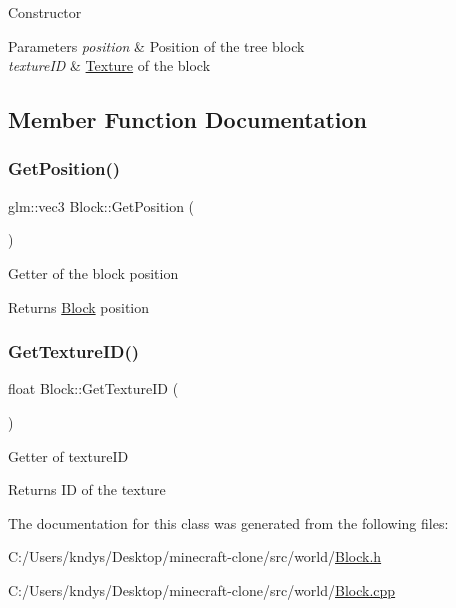 Constructor 


\begin{DoxyParams}{Parameters}
{\em position} & Position of the tree block\\
\hline
{\em texture\+ID} & \mbox{\hyperlink{class_texture}{Texture}} of the block\\
\hline
\end{DoxyParams}


\subsection{Member Function Documentation}
\mbox{\label{class_block_aa35387c6d2b82e94188fa76559ac4d78}} 
\subsubsection{\texorpdfstring{Get\+Position()}{GetPosition()}}
{\footnotesize\ttfamily glm\+::vec3 Block\+::\+Get\+Position (\begin{DoxyParamCaption}{ }\end{DoxyParamCaption})}



Getter of the block position 

\begin{DoxyReturn}{Returns}
\mbox{\hyperlink{class_block}{Block}} position
\end{DoxyReturn}
\mbox{\label{class_block_af44cfa5e8853286c3f014e97eaabbaa4}} 
\subsubsection{\texorpdfstring{Get\+Texture\+I\+D()}{GetTextureID()}}
{\footnotesize\ttfamily float Block\+::\+Get\+Texture\+ID (\begin{DoxyParamCaption}{ }\end{DoxyParamCaption})}



Getter of texture\+ID 

\begin{DoxyReturn}{Returns}
ID of the texture
\end{DoxyReturn}


The documentation for this class was generated from the following files\+:\begin{DoxyCompactItemize}
\item 
C\+:/\+Users/kndys/\+Desktop/minecraft-\/clone/src/world/\mbox{\hyperlink{_block_8h}{Block.\+h}}\item 
C\+:/\+Users/kndys/\+Desktop/minecraft-\/clone/src/world/\mbox{\hyperlink{_block_8cpp}{Block.\+cpp}}\end{DoxyCompactItemize}
